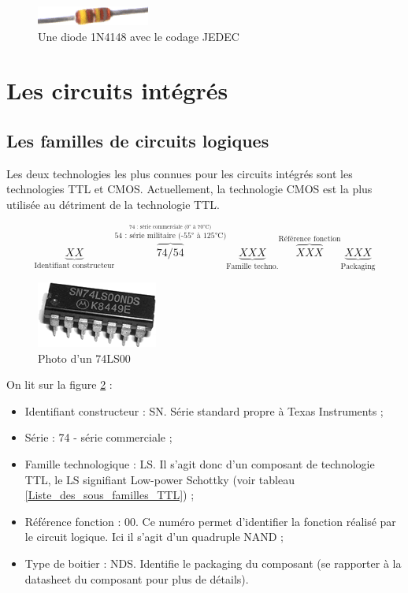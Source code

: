 \documentclass[a4paper]{article}
\begin{document}
\begin{figure}[H]
	\centering
	\includegraphics[scale=0.75]{Images/Diode_1N4148_JEDEC.png}
	\caption{Une diode 1N4148 avec le codage JEDEC
		\label{Diode_1N4148_JEDEC}}
\end{figure}

\section{Les circuits intégrés}

\subsection{Les familles de circuits logiques}

Les deux technologies les plus connues pour les circuits intégrés sont les technologies \ac{TTL} et \ac{CMOS}. Actuellement, la technologie \ac{CMOS} est la plus utilisée au détriment de la technologie \ac{TTL}.

\[\underbrace{XX}_{\textrm{Identifiant constructeur}} \overbrace{74/54}^{\stackrel{\textrm{74 : série commerciale (0° à 70°C)}}{\textrm{54 : série militaire (-55° à 125°C)}}} \underbrace{XXX}_{\textrm{Famille techno.}} \overbrace{XXX}^{\textrm{Référence fonction}} \underbrace{XXX}_{\textrm{Packaging}}\]

\begin{figure}[H]
	\centering
	\includegraphics[scale=0.75]{Images/Photo_74LS00.png}
	\caption{Photo d'un 74LS00
		\label{Photo_74LS00}}
\end{figure}

On lit sur la figure \ref{Photo_74LS00} :
\begin{itemize}
	\item Identifiant constructeur : SN. Série standard propre à Texas Instruments ;
	\item Série : 74 - série commerciale ;
	\item Famille technologique : LS. Il s'agit donc d'un composant de technologie \ac{TTL}, le LS signifiant Low-power Schottky (voir tableau \ref{Liste_des_sous_familles_TTL}) ;
	\item Référence fonction : 00. Ce numéro permet d'identifier la fonction réalisé par le circuit logique. Ici il s'agit d'un  quadruple NAND ;
	\item Type de boitier : NDS. Identifie le packaging du composant (se rapporter à la datasheet du composant pour plus de détails).
\end{itemize}
\end{document}
